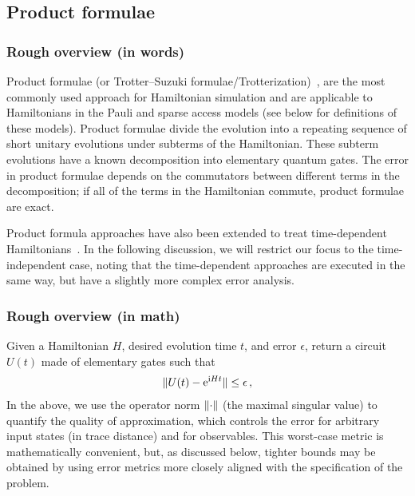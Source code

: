 \begin{refsection}

\subsection{Product formulae}\label{prim:ProductFormulae}


\subsubsection*{Rough overview (in words)}
Product formulae (or Trotter--Suzuki formulae/Trotterization)~\cite{lloyd1996UnivQSim}, are the most commonly used approach for Hamiltonian simulation and are applicable to Hamiltonians in the Pauli and sparse access models (see below for definitions of these models). Product formulae divide the evolution into a repeating sequence of short unitary evolutions under subterms of the Hamiltonian. These subterm evolutions have a known decomposition into elementary quantum gates. The error in product formulae depends on the commutators between different terms in the decomposition; if all of the terms in the Hamiltonian commute, product formulae are exact.

Product formula approaches have also been extended to treat time-dependent Hamiltonians~\cite{huyghebaert1990TimeDependent,wiebe2010TimeDepTrotter,wecker2015StronglyCorrelated,An2021TimeDependent, poulin2011TimeDepTrotterRandomized}. In the following discussion, we will restrict our focus to the time-independent case, noting that the time-dependent approaches are executed in the same way, but have a slightly more complex error analysis. 




\subsubsection*{Rough overview (in math)}
Given a Hamiltonian $H$, desired evolution time $t$, and error $\epsilon$, return a circuit $U(t)$ made of elementary gates such that
\begin{align}
    \lVert U(t) - \mathrm{e}^{\mathrm{i} H t} \rVert \le \epsilon\,,
\end{align}
In the above, we use the operator norm $\lVert\cdot\rVert$ (the maximal singular value) to quantify the quality of approximation, which controls the error for arbitrary input states (in trace distance) and for observables. This worst-case metric is mathematically convenient, but, as discussed below, tighter bounds may be obtained by using error metrics more closely aligned with the specification of the problem.


\end{refsection}

